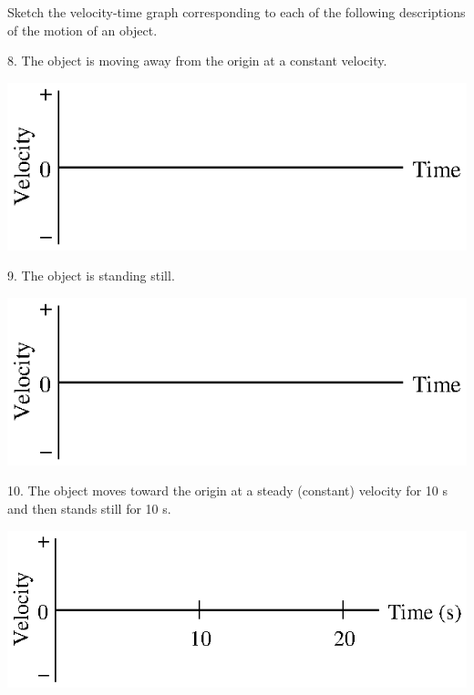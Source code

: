 Sketch the velocity-time graph corresponding to each of the following descriptions
of the motion of an object.

8. The object is moving away from the origin at a constant velocity.

\vspace{0.3cm}
{\par\centering \includegraphics{velocity/velocity_fig15.eps} \par}
\vspace{0.3cm}

9. The object is standing still.

\vspace{0.3cm}
{\par\centering \includegraphics{velocity/velocity_fig15.eps} \par}
\vspace{0.3cm}

10. The object moves toward the origin at a steady (constant) velocity for 10
s and then stands still for 10 s.

\vspace{0.3cm}
{\par\centering \includegraphics{velocity/velocity_fig16.eps} \par}
\vspace{0.3cm}


